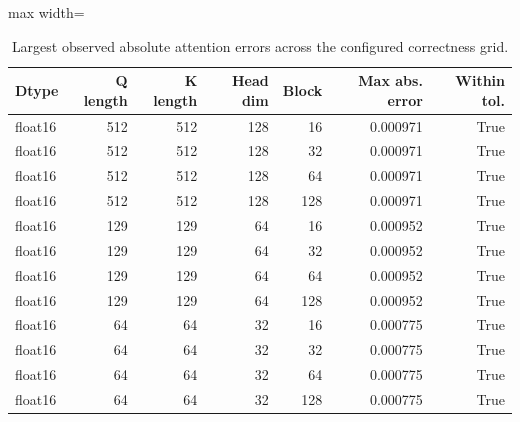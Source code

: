 \begin{table}[t]
\centering
\caption{Largest observed absolute attention errors across the configured correctness grid.}
\label{tab:attention-accuracy}
\begin{adjustbox}{max width=\columnwidth}
\begin{tabular}{lrrrrrr}
\toprule
Dtype & Q length & K length & Head dim & Block & Max abs. error & Within tol. \\
\midrule
float16 & 512 & 512 & 128 & 16 & 0.000971 & True \\
float16 & 512 & 512 & 128 & 32 & 0.000971 & True \\
float16 & 512 & 512 & 128 & 64 & 0.000971 & True \\
float16 & 512 & 512 & 128 & 128 & 0.000971 & True \\
float16 & 129 & 129 & 64 & 16 & 0.000952 & True \\
float16 & 129 & 129 & 64 & 32 & 0.000952 & True \\
float16 & 129 & 129 & 64 & 64 & 0.000952 & True \\
float16 & 129 & 129 & 64 & 128 & 0.000952 & True \\
float16 & 64 & 64 & 32 & 16 & 0.000775 & True \\
float16 & 64 & 64 & 32 & 32 & 0.000775 & True \\
float16 & 64 & 64 & 32 & 64 & 0.000775 & True \\
float16 & 64 & 64 & 32 & 128 & 0.000775 & True \\
\bottomrule
\end{tabular}
\end{adjustbox}
\end{table}
